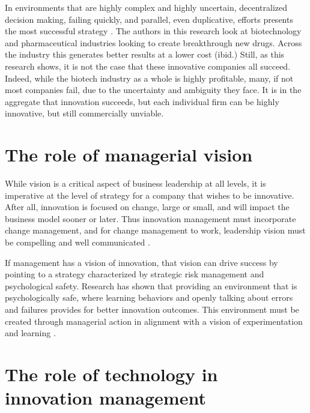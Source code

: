 \documentclass[man]{apa7}
\begin{document}
In environments that are highly complex and highly uncertain, decentralized decision making, failing quickly, and parallel, even duplicative, efforts presents the most successful strategy \cite{drakemanRiskDeRiskingInnovation2020}. The authors in this research look at biotechnology and pharmaceutical industries looking to create breakthrough new drugs. Across the industry this generates better results at a lower cost (ibid.) Still, as this research shows, it is not the case that these innovative companies all succeed. Indeed, while the biotech industry as a whole is highly profitable, many, if not most companies fail, due to the uncertainty and ambiguity they face. It is in the aggregate that innovation succeeds, but each individual firm can be highly innovative, but still commercially unviable.   

\section{The role of managerial vision}
\label{sec:orge491260}

While vision is a critical aspect of business leadership at all levels, it is imperative at the level of strategy for a company that wishes to be innovative. After all, innovation is focused on change, large or small, and will impact the business model sooner or later. Thus innovation management must incorporate change management, and for change management to work, leadership vision must be compelling and well communicated \cite{appelbaumBackFutureRevisiting2012,kotterLeadingChange2012}.

If management has a vision of innovation, that vision can drive success by pointing to a strategy characterized by strategic risk management and psychological safety. Research has shown that providing an environment that is psychologically safe, where learning behaviors and openly talking about errors and failures provides for better innovation outcomes. This environment must be created through managerial action in alignment with a vision of experimentation and learning \parencite{anderssonOrganizationalClimatePsychological2020}.


\section{The role of technology in innovation management}
\label{sec:orgd7d98dd}
\end{document}
